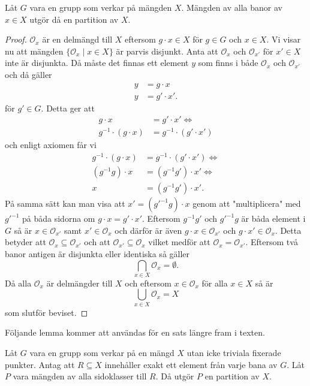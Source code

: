 \documentclass{article}
\newcommand{\orbit}[0]{\mathcal{O}}
\theoremstyle{definition}
\begin{document}
\begin{mytheo}{}{}
  Låt $G$ vara en grupp som verkar på mängden $X$. Mängden av alla banor av $x \in X$
  utgör då en partition av $X$. 
\end{mytheo}
\begin{proof}
  $\orbit_x$ är en delmängd till $X$ eftersom $g \cdot x \in X$ för $g \in G$ och $x \in X$.
  Vi visar nu att mängden $\{\orbit_x \; | \; x \in X\}$ är parvis disjunkt. 
  Anta att $\orbit_x$
  och $\orbit_{x'}$ för $x' \in X$ inte är disjunkta. Då måste det finnas 
  ett element $y$ som finns i både $\orbit_x$ och $\orbit_{x'}$ och då gäller 
  \begin{align*}
    y &= g \cdot x \\
    y &= g' \cdot x'.
  \end{align*}
  för $g' \in G.$ Detta ger att 
  \begin{align*}
    g \cdot x &= g' \cdot x' \iff \\
    g^{-1} \cdot (g \cdot x) &= g^{-1} \cdot (g' \cdot x')
  \end{align*}
  och enligt axiomen får vi 
  \begin{align*}
    g^{-1} \cdot (g \cdot x) &= g^{-1} \cdot (g' \cdot x') \iff \\
    (g^{-1} g) \cdot x &= (g^{-1} g') \cdot x' \iff \\
    x &= (g^{-1} g') \cdot x'.
  \end{align*} 
  På samma sätt kan man visa att $x' = (g'^{-1}g) \cdot x$ genom att 
  "multiplicera" med $g'^{-1}$ på båda sidorna om $g \cdot x = g' \cdot x'$. 
  Eftersom $g^{-1} g'$ och $g'^{-1}g$ är båda element i $G$ så är 
  $x \in \orbit_{x'}$ samt $x' \in \orbit_x$ och därför är även $g \cdot x \in \orbit_{x'}$
  och $g \cdot x' \in \orbit_{x}$. Detta betyder att $\orbit_x \subseteq \orbit_{x'}$ och att 
  $\orbit_{x'} \subseteq \orbit_x$ vilket medför att $\orbit_x = \orbit_{x'}$.
  Eftersom två banor antigen är disjunkta eller identiska så gäller 
  \[\bigcap_{x \in X} \orbit_x = \emptyset.\]
  Då alla $\orbit_x$ är delmängder till $X$ och eftersom $x \in \orbit_x$ för alla $x \in X$ så är 
  \[\bigcup_{x \in X} \orbit_x = X\]
  som slutför beviset.
\end{proof}

Följande lemma kommer att användas för en sats längre fram i texten. 

\begin{mylemma}{}{}
  Låt $G$ vara en grupp som verkar på en mängd $X$ utan icke triviala fixerade punkter. Antag att $R \subseteq X$
  innehåller exakt ett element från varje bana av $G$. Låt $P$ vara mängden av alla sidoklasser till $R$. Då utgör $P$ en partition av $X$.
\end{mylemma}
\end{document}
